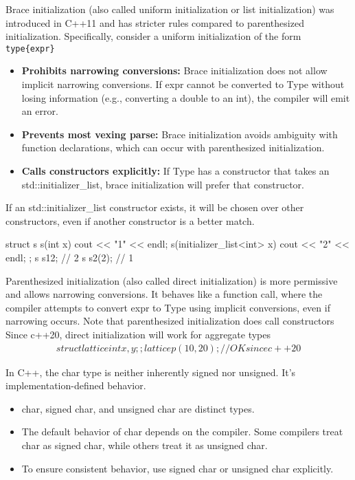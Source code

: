 \documentclass{report}
\begin{document}
    \pagebreak 
    \bigbreak \noindent 
    Brace initialization (also called uniform initialization or list initialization) was introduced in C++11 and has stricter rules compared to parenthesized initialization. Specifically, consider a uniform initialization of the form \texttt{type\{expr\}}
    \begin{itemize}
        \item \textbf{Prohibits narrowing conversions:} Brace initialization does not allow implicit narrowing conversions. If expr cannot be converted to Type without losing information (e.g., converting a double to an int), the compiler will emit an error.
        \item \textbf{Prevents most vexing parse:} Brace initialization avoids ambiguity with function declarations, which can occur with parenthesized initialization.
        \item \textbf{Calls constructors explicitly:} If Type has a constructor that takes an std::initializer\_list, brace initialization will prefer that constructor.
    \end{itemize}
    \bigbreak \noindent 
    If an std::initializer\_list constructor exists, it will be chosen over other constructors, even if another constructor is a better match.
    \bigbreak \noindent 
    \begin{cppcode}
        struct s {
            s(int x) {cout << "1" << endl;}
            s(initializer_list<int> x) {cout << "2" << endl;}
        };
        s s1{2}; // 2
        s s2(2); // 1
    \end{cppcode}




    \bigbreak \noindent 
    Parenthesized initialization (also called direct initialization) is more permissive and allows narrowing conversions. It behaves like a function call, where the compiler attempts to convert expr to Type using implicit conversions, even if narrowing occurs.
    \bigbreak \noindent 
    Note that parenthesized initialization does call constructors
    \bigbreak \noindent 
    Since c++20, direct initialization will work for aggregate types
    \begin{align*}
        struct lattice {
            int x,y;
        };
        lattice p(10,20); // OK since c++20
    \end{align*}


    \pagebreak 
    \bigbreak \noindent 
    In C++, the char type is neither inherently signed nor unsigned. It's implementation-defined behavior.
    \begin{itemize}
        \item char, signed char, and unsigned char are distinct types.
        \item The default behavior of char depends on the compiler. Some compilers treat char as signed char, while others treat it as unsigned char.
        \item To ensure consistent behavior, use signed char or unsigned char explicitly.
    \end{itemize}
\end{document}
